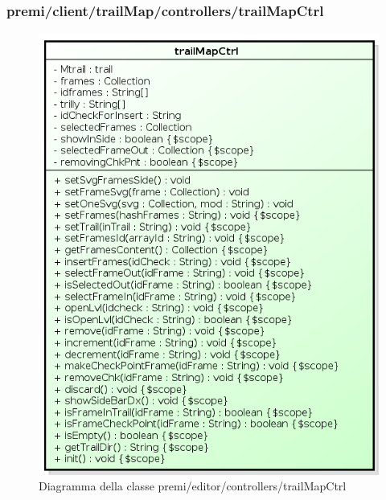 \subsubsection{premi/client/trailMap/controllers/trailMapCtrl}
\begin{figure}[H]
\begin{center}
\includegraphics[scale=0.85]{img/diacla/TrailMapCtrl.png}
\caption{Diagramma della classe premi/editor/controllers/trailMapCtrl}
\end{center}
\end{figure}

